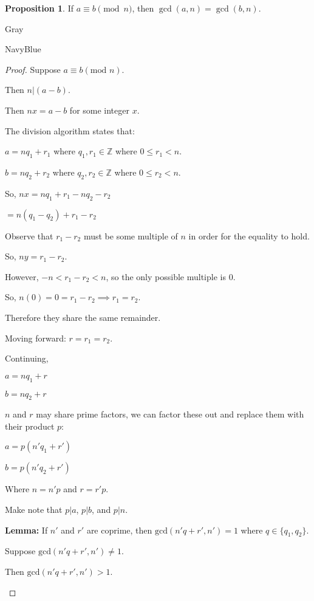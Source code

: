 \documentclass[12pt]{amsart}
\theoremstyle{named}
\newenvironment{prf}
{\medskip\begin{color}{Gray}\begin{framed}\begin{color}{NavyBlue}\begin{proof}[Proof]
\doublespacing}
{\end{proof}\end{color}\end{framed}\end{color}\medskip}
\theoremstyle{definition}
\newtheorem{proposition}{Proposition}
\begin{document}
\begin{proposition}
	If $a\equiv b\pmod n$, then $\gcd(a,n) = \gcd(b,n)$.
\end{proposition}

\begin{prf}
	\phantom{ }

	Suppose $a \equiv b (\text{mod } n)$.

	Then $n|(a-b)$.

	Then $nx = a-b$ for some integer $x$.

	The division algorithm states that:

	$a = nq_1 + r_1$ where $q_1, r_1 \in \mathbb Z$ where $0 \leq r_1 < n$.

	$b = nq_2 + r_2$ where $q_2, r_2 \in \mathbb Z$ where $0 \leq r_2 < n$.

	So, $nx = nq_1 + r_1 - nq_2 - r_2$

	$= n(q_1 - q_2) + r_1 - r_2$

	Observe that $r_1 - r_2$ must be some multiple of $n$ in order for the equality to hold.

	So, $ny = r_1-r_2$.

	However, $-n < r_1 - r_2 < n$, so the only possible multiple is $0$.

	So, $n(0) = 0 = r_1-r_2 \implies r_1 = r_2$.

	Therefore they share the same remainder.

	\phantom{ }

	Moving forward: $r = r_1 = r_2$.

	Continuing, 

	$a = nq_1 + r$

	$b = nq_2 + r$

	$n$ and $r$ may share prime factors, we can factor these out and replace them with their
	product $p$:

	$a = p(n'q_1+r')$

	$b = p(n'q_2+r')$

	Where $n = n'p$ and $r = r'p$.

	Make note that $p|a$, $p|b$, and $p|n$.

	\textbf{Lemma:} If $n'$ and $r'$ are coprime, then $\text{gcd}(n'q+r',n')
	= 1$ where $q \in \{q_1,q_2\}$. 

	\begin{adjustwidth}{2em}{0em}
		Suppose $\text{gcd}(n'q+r',n') \neq 1$.

		Then $\text{gcd}(n'q+r',n') > 1$.


\end{adjustwidth}
\end{prf}
\end{document}
